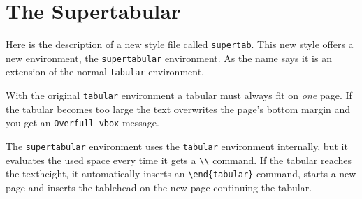 \setlength{\topmargin}{0cm}
\setlength{\oddsidemargin}{0cm}
\setlength{\textheight}{23cm}
\setlength{\textwidth}{15cm}
\newcommand{\tbsp}{\rule{0pt}{18pt}}

\section{The Supertabular}
Here is the description of a new style file called \verb|supertab|.
This new style offers a new environment, the \verb|supertabular|
environment. As the name says it is an extension of the normal
\verb|tabular| environment.

With the original \verb|tabular| environment a tabular must always fit
on {\it one} page. If the tabular becomes too large the text overwrites
the page's bottom margin and you get an \verb|Overfull vbox| message.

The \verb|supertabular| environment uses the \verb|tabular| environment
internally, but it evaluates the used space every time it gets a
\verb|\\| command. If the tabular reaches the textheight,
it automatically inserts an \verb|\end{tabular}| command, starts a new
page and inserts the tablehead on the new page continuing the tabular.


